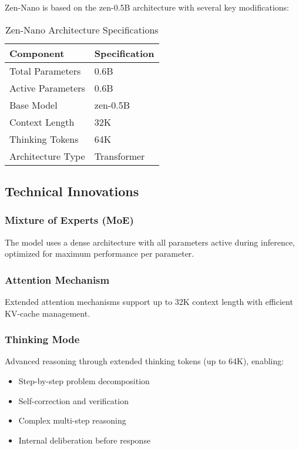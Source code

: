 \documentclass[11pt,a4paper]{article}
\begin{document}
Zen-Nano is based on the zen-0.5B architecture with several key modifications:

\begin{table}[H]
\centering
\begin{tabular}{ll}
\toprule
\textbf{Component} & \textbf{Specification} \\
\midrule
Total Parameters & 0.6B \\
Active Parameters & 0.6B \\
Base Model & zen-0.5B \\
Context Length & 32K \\
Thinking Tokens & 64K \\


Architecture Type & Transformer \\
\bottomrule
\end{tabular}
\caption{Zen-Nano Architecture Specifications}
\end{table}

\subsection{Technical Innovations}

\subsubsection{Mixture of Experts (MoE)}
The model uses a dense architecture with all parameters active during inference, optimized for maximum performance per parameter.

\subsubsection{Attention Mechanism}
Extended attention mechanisms support up to 32K context length with efficient KV-cache management.

\subsubsection{Thinking Mode}
Advanced reasoning through extended thinking tokens (up to 64K), enabling:
\begin{itemize}
    \item Step-by-step problem decomposition
    \item Self-correction and verification
    \item Complex multi-step reasoning
    \item Internal deliberation before response
\end{itemize}
\end{document}
